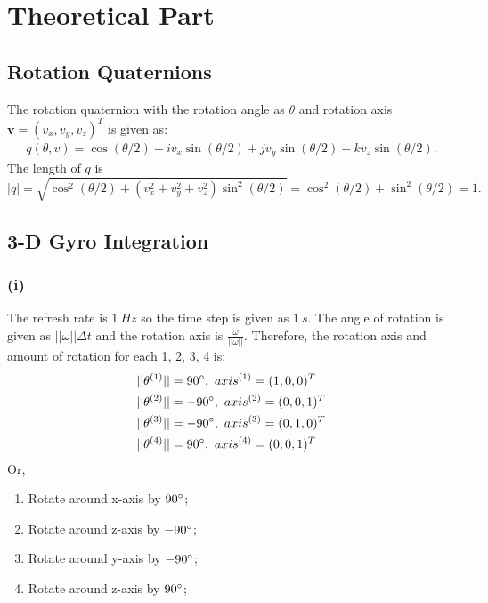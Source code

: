 \documentclass[11pt]{article}
\begin{document}
 


\section{Theoretical Part}
\subsection{Rotation Quaternions}



The rotation quaternion with the rotation angle as $\theta$ and rotation axis $\textbf{v} = (v_x, v_y, v_z)^T $ is given as:
\begin{align}
    q(\theta,v) = \cos(\theta/2) + i v_x \sin(\theta/2) + j v_y \sin(\theta/2) + k v_z \sin(\theta/2).
\end{align}
The length of $q$ is \[|q| = \sqrt{\cos^2(\theta/2)+( v_x^2 + v_y^2 + v_z^2) \sin^2(\theta/2)} = \cos^2(\theta/2) + \sin^2(\theta/2) = 1.\]

\subsection{3-D Gyro Integration}
\subsubsection*{(i)}
The refresh rate is $1\ Hz$ so the time step is given as $1\ s$. The angle of rotation is given as $||\omega||\Delta{t}$ and the rotation axis is $\frac{\omega}{||\omega||}$. Therefore, the rotation axis and amount of rotation for each 1, 2, 3, 4 is:
\begin{align*}
    & ||\theta^{(1)}|| = 90 \degree,\ axis^{(1)}=(1,0,0)^T\\
    & ||\theta^{(2)}|| = -90 \degree,\ axis^{(2)}=(0,0,1)^T\\
    & ||\theta^{(3)}|| = -90 \degree,\ axis^{(3)}=(0,1,0)^T\\
    & ||\theta^{(4)}|| = 90 \degree,\ axis^{(4)}=(0,0,1)^T
\end{align*}
Or,
\begin{enumerate}
    \item Rotate around x-axis by $90 \degree$;
    \item Rotate around z-axis by $-90 \degree$;
    \item Rotate around y-axis by $-90 \degree$;
    \item Rotate around z-axis by $90 \degree$;
\end{enumerate}
\end{document}
